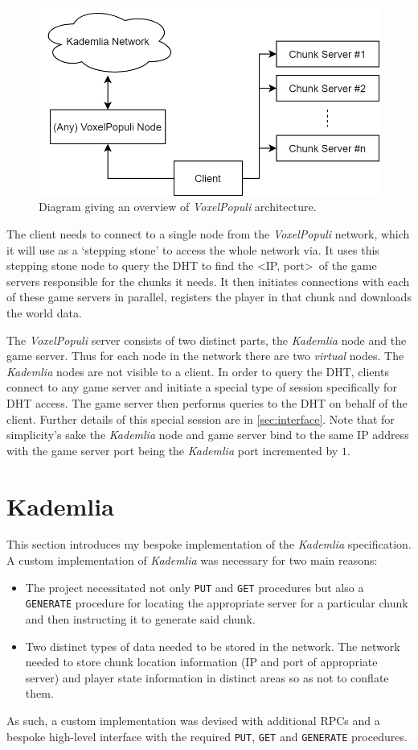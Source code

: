 \documentclass[10pt,twoside,notitlepage,a4paper]{report}
\newcommand{\kademlia}{\emph{Kademlia}}
\newcommand{\voxpop}{\emph{VoxelPopuli}}
\begin{document}
	\begin{figure}
		\includegraphics[width=\textwidth]{diag1.png}
		\caption{Diagram giving an overview of \voxpop{} architecture.}
		\label{fig:diagram1}
	\end{figure}
	The client needs to connect to a single node from the \voxpop{} network, which it will use as a `stepping stone' to access the whole network via. It uses this stepping stone node to query the DHT to find the \textless IP, port\textgreater~of the game servers responsible for the chunks it needs. It then initiates connections with each of these game servers in parallel, registers the player in that chunk and downloads the world data.
	
	The \voxpop{} server consists of two distinct parts, the \kademlia{} node and the game server. Thus for each node in the network there are two \emph{virtual} nodes. The \kademlia{} nodes are not visible to a client. In order to query the DHT, clients connect to any game server and initiate a special type of session specifically for DHT access. The game server then performs queries to the DHT on behalf of the client. Further details of this special session are in \cref{sec:interface}. Note that for simplicity's sake the \kademlia{} node and game server bind to the same IP address with the game server port being the \kademlia{} port incremented by $1$.
	
	\section{Kademlia}
	This section introduces my bespoke implementation of the \kademlia{} specification. A custom implementation of \kademlia{} was necessary for two main reasons:
	\begin{itemize}
		\item The project necessitated not only \texttt{PUT} and \texttt{GET} procedures but also a \texttt{GENERATE} procedure for locating the appropriate server for a particular chunk and then instructing it to generate said chunk.
		\item Two distinct types of data needed to be stored in the network. The network needed to store chunk location information (IP and port of appropriate server) and player state information in distinct areas so as not to conflate them.
	\end{itemize}
	As such, a custom implementation was devised with additional RPCs and a bespoke high-level interface with the required \texttt{PUT}, \texttt{GET} and \texttt{GENERATE} procedures.
	
\end{document}
